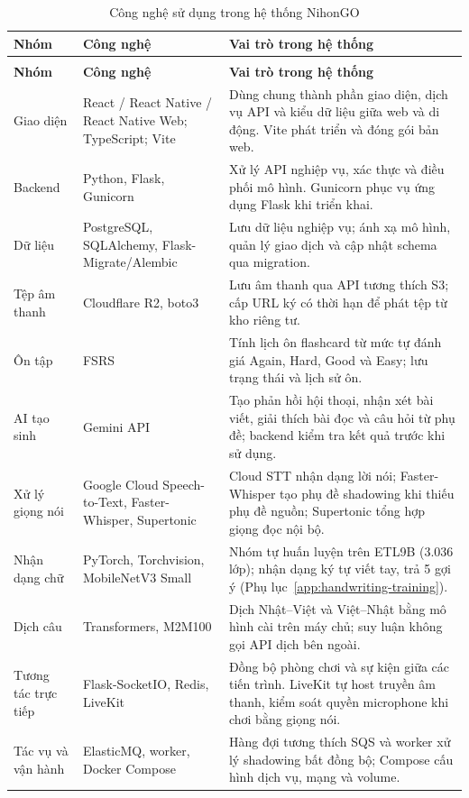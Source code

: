 \begin{longtable}{@{}>{\raggedright\arraybackslash}p{2.3cm}>{\raggedright\arraybackslash}p{4.2cm}>{\raggedright\arraybackslash}p{8.5cm}@{}}
\caption{Công nghệ sử dụng trong hệ thống NihonGO}
\label{tab:technologies-used}\\
\toprule
\textbf{Nhóm} & \textbf{Công nghệ} & \textbf{Vai trò trong hệ thống} \\
\midrule
\endfirsthead
\multicolumn{3}{c}{\tablename~\thetable{} (tiếp theo)}\\
\toprule
\textbf{Nhóm} & \textbf{Công nghệ} & \textbf{Vai trò trong hệ thống} \\
\midrule
\endhead
\bottomrule
\endfoot
Giao diện & React / React Native / React Native Web; TypeScript; Vite & Dùng chung thành phần giao diện, dịch vụ API và kiểu dữ liệu giữa web và di động. Vite phát triển và đóng gói bản web. \\
\midrule
Backend & Python, Flask, Gunicorn & Xử lý API nghiệp vụ, xác thực và điều phối mô hình. Gunicorn phục vụ ứng dụng Flask khi triển khai. \\
\midrule
Dữ liệu & PostgreSQL, SQLAlchemy, Flask-Migrate/Alembic & Lưu dữ liệu nghiệp vụ; ánh xạ mô hình, quản lý giao dịch và cập nhật schema qua migration. \\
\midrule
Tệp âm thanh & Cloudflare R2, boto3 & Lưu âm thanh qua API tương thích S3; cấp URL ký có thời hạn để phát tệp từ kho riêng tư. \\
\midrule
Ôn tập & FSRS & Tính lịch ôn flashcard từ mức tự đánh giá Again, Hard, Good và Easy; lưu trạng thái và lịch sử ôn. \\
\midrule
AI tạo sinh & Gemini API & Tạo phản hồi hội thoại, nhận xét bài viết, giải thích bài đọc và câu hỏi từ phụ đề; backend kiểm tra kết quả trước khi sử dụng. \\
\midrule
Xử lý giọng nói & Google Cloud Speech-to-Text, Faster-Whisper, Supertonic & Cloud STT nhận dạng lời nói; Faster-Whisper tạo phụ đề shadowing khi thiếu phụ đề nguồn; Supertonic tổng hợp giọng đọc nội bộ. \\
\midrule
Nhận dạng chữ & PyTorch, Torchvision, MobileNetV3 Small & Nhóm tự huấn luyện trên ETL9B (3.036 lớp); nhận dạng ký tự viết tay, trả 5 gợi ý (Phụ lục~\ref{app:handwriting-training}). \\
\midrule
Dịch câu & Transformers, M2M100 & Dịch Nhật--Việt và Việt--Nhật bằng mô hình cài trên máy chủ; suy luận không gọi API dịch bên ngoài. \\
\midrule
Tương tác trực tiếp & Flask-SocketIO, Redis, LiveKit & Đồng bộ phòng chơi và sự kiện giữa các tiến trình. LiveKit tự host truyền âm thanh, kiểm soát quyền microphone khi chơi bằng giọng nói. \\
\midrule
Tác vụ và vận hành & ElasticMQ, worker, Docker Compose & Hàng đợi tương thích SQS và worker xử lý shadowing bất đồng bộ; Compose cấu hình dịch vụ, mạng và volume. \\
\end{longtable}
\endgroup
